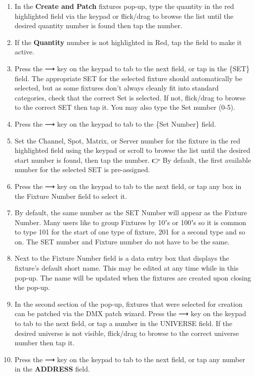 \documentclass[
]{article}
\begin{document}
\begin{enumerate}
\def\labelenumi{\arabic{enumi}.}
\item
  In the \textbf{Create and Patch} fixtures pop-up, type the quantity in the red highlighted field via the keypad or flick/drag to browse the list until the desired quantity number is found then tap the number.
\item
  If the \textbf{Quantity} number is not highlighted in {Red}, tap the field to make it active.
\item
  Press the ⟶ key on the keypad to tab to the next field, or tap in the \{SET\} field. The appropriate SET for the selected fixture should automatically be selected, but as some fixtures don't always cleanly fit into standard categories, check that the correct Set is selected. If not, flick/drag to browse to the correct SET then tap it. You may also type the Set number (0-5).
\item
  Press the ⟶ key on the keypad to tab to the \{Set Number\} field.
\item
  Set the Channel, Spot, Matrix, or Server number for the fixture in the red highlighted field using the keypad or scroll to browse the list until the desired start number is found, then tap the number.
  👉 By default, the first available number for the selected SET is pre-assigned.
\item
  Press the ⟶ key on the keypad to tab to the next field, or tap any box in the Fixture Number field to select it.
\item
  By default, the same number as the SET Number will appear as the Fixture Number. Many users like to group Fixtures by 10ʼs or 100ʼs so it is common to type 101 for the start of one type of fixture, 201 for a second type and so on. The SET number and Fixture number do not have to be the same.
\item
  Next to the Fixture Number field is a data entry box that displays the fixture's default short name. This may be edited at any time while in this pop-up. The name will be updated when the fixtures are created upon closing the pop-up.
\item
  In the second section of the pop-up, fixtures that were selected for creation can be patched via the DMX patch wizard. Press the ⟶ key on the keypad to tab to the next field, or tap a number in the UNIVERSE field. If the desired universe is not visible, flick/drag to browse to the correct universe number then tap it.
\item
  Press the ⟶ key on the keypad to tab to the next field, or tap any number in the \textbf{ADDRESS} field.
\end{enumerate}
\end{document}
